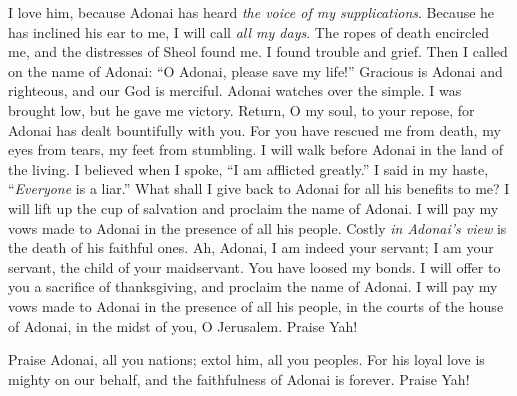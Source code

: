 \begin{biblechapter} %
 I love him, because Adonai has heard 
\textit{the voice of my supplications}.
\verse Because he has inclined his ear to me, 
I will call \textit{all my days}.
\verse The ropes of death encircled me, 
and the distresses of Sheol found me. 
I found trouble and grief.
\verse Then I called on the name of Adonai: 
“O Adonai, please save my life!”
\verse Gracious is Adonai and righteous, 
and our God is merciful.
\verse Adonai watches over the simple. 
I was brought low, but he gave me victory.
\verse Return, O my soul, to your repose, 
for Adonai has dealt bountifully with you.
\verse For you have rescued me from death, 
my eyes from tears, my feet from stumbling.
\verse I will walk before Adonai 
in the land of the living.
\verse I believed when I spoke, 
“I am afflicted greatly.”
\verse I said in my haste, 
“\textit{Everyone} is a liar.”
\verse What shall I give back to Adonai 
for all his benefits to me?
\verse I will lift up the cup of salvation 
and proclaim the name of Adonai.
\verse I will pay my vows made to Adonai 
in the presence of all his people.
\verse Costly \textit{in Adonai’s view} is 
the death of his faithful ones.
\verse Ah, Adonai, I am indeed your servant; 
I am your servant, the child of your maidservant. 
You have loosed my bonds.
\verse I will offer to you a sacrifice of thanksgiving, 
and proclaim the name of Adonai.
\verse I will pay my vows made to Adonai 
in the presence of all his people,
\verse in the courts of the house of Adonai, 
in the midst of you, O Jerusalem. 
Praise Yah!
\end{biblechapter}

\begin{biblechapter} %
 Praise Adonai, all you nations; 
extol him, all you peoples.
\verse For his loyal love is mighty on our behalf, 
and the faithfulness of Adonai is forever. 
Praise Yah!
\end{biblechapter}

